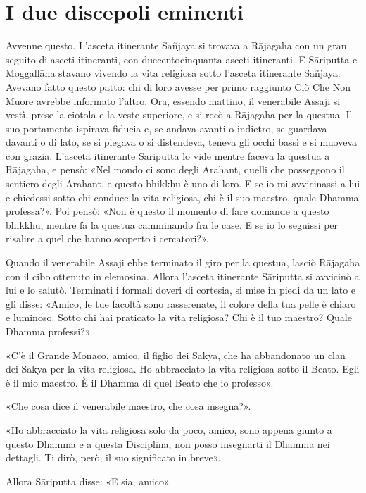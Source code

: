 \chapter{I due discepoli eminenti}

 Avvenne questo. L’asceta itinerante Sañjaya si trovava a
Rājagaha con un gran seguito di asceti itineranti, con duecentocinquanta
asceti itineranti. E Sāriputta e Moggallāna stavano vivendo la vita
religiosa sotto l’asceta itinerante Sañjaya. Avevano fatto questo patto:
chi di loro avesse per primo raggiunto Ciò Che Non Muore avrebbe
informato l’altro. Ora, essendo mattino, il venerabile Assaji si vestì,
prese la ciotola e la veste superiore, e si recò a Rājagaha per la
questua. Il suo portamento ispirava fiducia e, se andava avanti o
indietro, se guardava davanti o di lato, se si piegava o si distendeva,
teneva gli occhi bassi e si muoveva con grazia. L’asceta itinerante
Sāriputta lo vide mentre faceva la questua a Rājagaha, e pensò: «Nel
mondo ci sono degli Arahant, quelli che posseggono il sentiero degli
Arahant, e questo bhikkhu è uno di loro. E se io mi avvicinassi a lui e
chiedessi sotto chi conduce la vita religiosa, chi è il suo maestro,
quale Dhamma professa?». Poi pensò: «Non è questo il momento di fare
domande a questo bhikkhu, mentre fa la questua camminando fra le case. E
se io lo seguissi per risalire a quel che hanno scoperto i cercatori?».


Quando il venerabile Assaji ebbe terminato il giro per la questua,
lasciò Rājagaha con il cibo ottenuto in elemosina. Allora l’asceta
itinerante Sāriputta si avvicinò a lui e lo salutò. Terminati i formali
doveri di cortesia, si mise in piedi da un lato e gli disse: «Amico, le
tue facoltà sono rasserenate, il colore della tua pelle è chiaro e
luminoso. Sotto chi hai praticato la vita religiosa? Chi è il tuo
maestro? Quale Dhamma professi?».


«C’è il Grande Monaco, amico, il figlio dei Sakya, che ha abbandonato un
clan dei Sakya per la vita religiosa. Ho abbracciato la vita religiosa
sotto il Beato. Egli è il mio maestro. È il Dhamma di quel Beato che io
professo».


«Che cosa dice il venerabile maestro, che cosa insegna?».


«Ho abbracciato la vita religiosa solo da poco, amico, sono appena
giunto a questo Dhamma e a questa Disciplina, non posso insegnarti il
Dhamma nei dettagli. Ti dirò, però, il suo significato in breve».


Allora Sāriputta disse: «E sia, amico».


